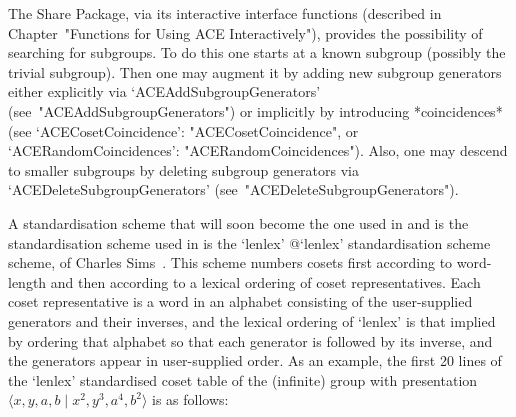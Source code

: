 
The  {\ACE}  Share  Package,  via  its  interactive  {\ACE}  interface
functions   (described   in   Chapter~"Functions   for    Using    ACE
Interactively"), provides the possibility of searching for  subgroups.
To do this one starts  at  a  known  subgroup  (possibly  the  trivial
subgroup). Then one may augment it by adding new  subgroup  generators
either        explicitly        via         `ACEAddSubgroupGenerators'
(see~"ACEAddSubgroupGenerators")   or   implicitly   by    introducing
*coincidences*     (see     `ACECosetCoincidence':
"ACECosetCoincidence",           or           `ACERandomCoincidences':
"ACERandomCoincidences"). Also, one may descend to  smaller  subgroups
by  deleting  subgroup  generators  via  `ACEDeleteSubgroupGenerators'
(see~"ACEDeleteSubgroupGenerators").


A standardisation scheme that will soon become the one used in  {\GAP}
and  is  the  standardisation   scheme   used   in   {\ACE}   is   the
`lenlex'{\undoquotes{} {@`lenlex'
standardisation scheme}} scheme, of Charles  Sims~\cite{Sims94}.  This
scheme  numbers  cosets  first  according  to  word-length  and   then
according to a lexical ordering of coset representatives.  Each  coset
representative  is  a  word  in  an   alphabet   consisting   of   the
user-supplied generators and their inverses, and the lexical  ordering
of `lenlex' is that implied by ordering that  alphabet  so  that  each
generator is followed by its inverse, and  the  generators  appear  in
user-supplied order. As an example, the first 20 lines of the `lenlex'
standardised coset table of the  (infinite)  group  with  presentation
$\langle x, y, a, b \mid x^2, y^3, a^4, b^2\rangle$ is as follows:

